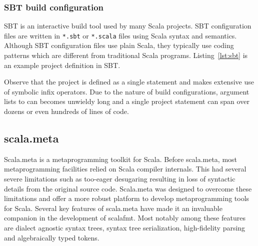 % 
% 

\subsubsection{SBT build configuration}\label{sec:sbt}
SBT\autocite{_sbt_????} is an interactive build tool used by many Scala projects.
SBT configuration files are written in \texttt{*.sbt} or \texttt{*.scala} files using Scala syntax and semantics.
Although SBT configuration files use plain Scala, they typically use coding patterns which are different from traditional Scala programs.
Listing~\ref{lst:sbt} is an example project definition in SBT.

Observe that the project is defined as a single statement and makes extensive use of symbolic infix operators.
Due to the nature of build configurations, argument lists to can becomes unwieldy long and a single project statement can span over dozens or even hundreds of lines of code.


\subsection{scala.meta}\label{sec:scalameta}
Scala.meta\autocite{scala57:online} is a metaprogramming toolkit for Scala.
Before scala.meta, most metaprogramming facilities relied on Scala compiler internals.
This had several severe limitations such as too-eager desugaring resulting in loss of syntactic details from the original source code.
Scala.meta was designed to overcome these limitations and offer a more robust platform to develop metaprogramming tools for Scala.
Several key features of scala.meta have made it an invaluable companion in the development of scalafmt.
Most notably among these features are dialect agnostic syntax trees, syntax tree serialization, high-fidelity  parsing and algebraically typed tokens.

